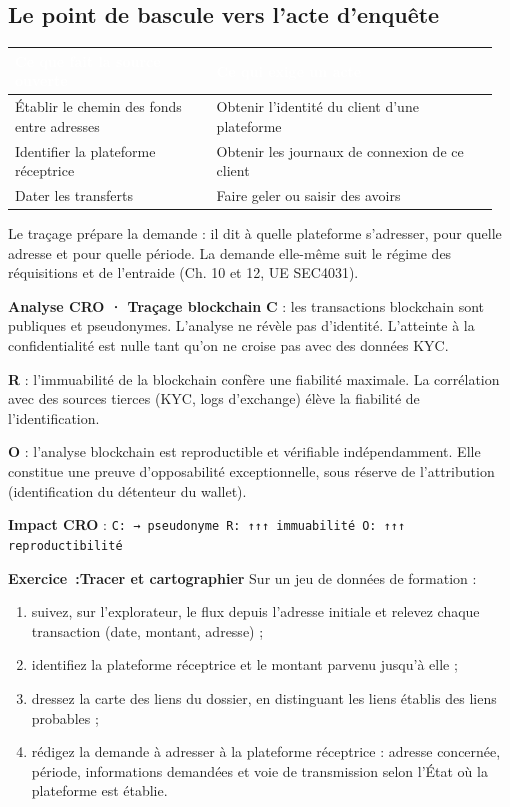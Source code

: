 \subsection{Le point de bascule vers l'acte d'enquête}

\begin{longtable}{p{0.40\linewidth}p{0.56\linewidth}}
\rowcolor{TableauEntete}\textcolor{white}{\bfseries Ce que fait la source ouverte} & \textcolor{white}{\bfseries Ce qui exige un acte} \\ \hline
Établir le chemin des fonds entre adresses & Obtenir l'identité du client d'une plateforme \\
Identifier la plateforme réceptrice & Obtenir les journaux de connexion de ce client \\
Dater les transferts & Faire geler ou saisir des avoirs \\
\end{longtable}

Le traçage prépare la demande : il dit à quelle plateforme s'adresser, pour quelle adresse et pour quelle période. La demande elle-même suit le régime des réquisitions et de l'entraide (Ch. 10 et 12, UE SEC4031).

\begin{boxCRO}
\textbf{Analyse CRO · Traçage blockchain}
\textbf{C} : les transactions blockchain sont publiques et pseudonymes. L'analyse ne révèle pas d'identité. L'atteinte à la confidentialité est nulle tant qu'on ne croise pas avec des données KYC.

\textbf{R} : l'immuabilité de la blockchain confère une fiabilité maximale. La corrélation avec des sources tierces (KYC, logs d'exchange) élève la fiabilité de l'identification.

\textbf{O} : l'analyse blockchain est reproductible et vérifiable indépendamment. Elle constitue une preuve d'opposabilité exceptionnelle, sous réserve de l'attribution (identification du détenteur du wallet).

\textbf{Impact CRO} : \texttt{C: → pseudonyme \quad R: ↑↑↑ immuabilité \quad O: ↑↑↑ reproductibilité}
\end{boxCRO}

\begin{boxexo}
\textbf{Exercice~:Tracer et cartographier}
Sur un jeu de données de formation :
\begin{enumerate}
\item suivez, sur l'explorateur, le flux depuis l'adresse initiale et relevez chaque transaction (date, montant, adresse) ;
\item identifiez la plateforme réceptrice et le montant parvenu jusqu'à elle ;
\item dressez la carte des liens du dossier, en distinguant les liens établis des liens probables ;
\item rédigez la demande à adresser à la plateforme réceptrice : adresse concernée, période, informations demandées et voie de transmission selon l'État où la plateforme est établie.
\end{enumerate}
\end{boxexo}


